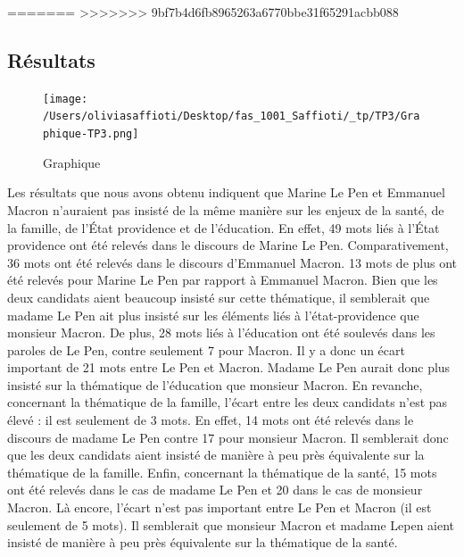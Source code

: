 \documentclass[
  letterpaper,
  DIV=11,
  numbers=noendperiod]{scrartcl}
\begin{document}
=======
>>>>>>> 9bf7b4d6fb8965263a6770bbe31f65291acbb088
\hypertarget{ruxe9sultats}{%
\subsection{Résultats}\label{ruxe9sultats}}

\begin{figure}

{\centering \texttt{[image: /Users/oliviasaffioti/Desktop/fas\_1001\_Saffioti/\_tp/TP3/Graphique-TP3.png]}

}

\caption{Graphique}

\end{figure}

Les résultats que nous avons obtenu indiquent que Marine Le Pen et
Emmanuel Macron n'auraient pas insisté de la même manière sur les enjeux
de la santé, de la famille, de l'État providence et de l'éducation. En
effet, 49 mots liés à l'État providence ont été relevés dans le discours
de Marine Le Pen. Comparativement, 36 mots ont été relevés dans le
discours d'Emmanuel Macron. 13 mots de plus ont été relevés pour Marine
Le Pen par rapport à Emmanuel Macron. Bien que les deux candidats aient
beaucoup insisté sur cette thématique, il semblerait que madame Le Pen
ait plus insisté sur les éléments liés à l'état-providence que monsieur
Macron. De plus, 28 mots liés à l'éducation ont été soulevés dans les
paroles de Le Pen, contre seulement 7 pour Macron. Il y a donc un écart
important de 21 mots entre Le Pen et Macron. Madame Le Pen aurait donc
plus insisté sur la thématique de l'éducation que monsieur Macron. En
revanche, concernant la thématique de la famille, l'écart entre les deux
candidats n'est pas élevé : il est seulement de 3 mots. En effet, 14
mots ont été relevés dans le discours de madame Le Pen contre 17 pour
monsieur Macron. Il semblerait donc que les deux candidats aient insisté
de manière à peu près équivalente sur la thématique de la famille.
Enfin, concernant la thématique de la santé, 15 mots ont été relevés
dans le cas de madame Le Pen et 20 dans le cas de monsieur Macron. Là
encore, l'écart n'est pas important entre Le Pen et Macron (il est
seulement de 5 mots). Il semblerait que monsieur Macron et madame Lepen
aient insisté de manière à peu près équivalente sur la thématique de la
santé.
\end{document}
